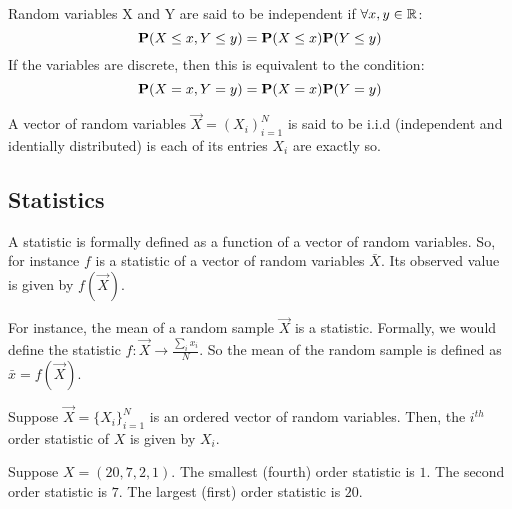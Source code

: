 
\begin{definition}[Independence]
Random variables X and Y are said to be independent if $\forall x,y \in \R$:
$$ \P(X \leq x, Y \leq y) = \P(X \leq x) \P(Y \leq y)$$
If the variables are discrete, then this is equivalent to the condition:
$$ \P(X = x, Y = y) = \P(X = x) \P(Y = y) $$
\end{definition}

\begin{definition}[i.i.d]
A vector of random variables $\vec{X} = (X_i)_{i = 1}^N$ is said to be i.i.d (independent and identially distributed) is each of its entries $X_i$ are exactly so.
\end{definition}

\subsection{Statistics}

\begin{definition}[Statistic]
A statistic is formally defined as a function of a vector of random variables. So, for instance $f$ is a statistic of a vector of random variables $\bar{X}$. Its observed value is given by $f(\vec{X})$.
\end{definition}

\begin{example}
For instance, the mean of a random sample $\vec{X}$ is a statistic. Formally, we would define the statistic $f : \vec{X} \to \frac{\sum_i x_i}{N}$. So the mean of the random sample is defined as $\bar{x} = f(\vec{X})$.
\end{example}


\begin{definition}
Suppose $\vec{X} = \{X_i\}_{i = 1}^N$ is an ordered vector of random variables. Then, the $i^{th}$ order statistic of $X$ is given by $X_i$.
\end{definition}

\begin{example}
Suppose $X = (20,7,2,1)$. The smallest (fourth) order statistic is $1$. The second order statistic is $7$. The largest (first) order statistic is $20$.
\end{example}

